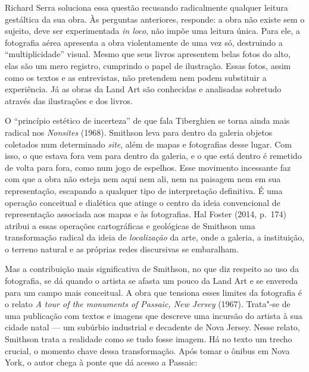 Richard Serra soluciona essa questão recusando radicalmente qualquer
leitura gestáltica da sua obra. Às perguntas anteriores, responde: a
obra não existe sem o sujeito, deve ser experimentada \emph{in loco},
não impõe uma leitura única. Para ele, a fotografia aérea apresenta a
obra violentamente de uma vez só, destruindo a ``multiplicidade''
visual. Mesmo que seus livros apresentem belas fotos do alto, elas são um mero registro, cumprindo o papel de
ilustração. Essas fotos, assim como os textos e as entrevistas, não
pretendem nem podem substituir a experiência. Já as obras da Land Art
são conhecidas e analisadas sobretudo através das ilustrações e dos
livros.

O ``princípio estético de incerteza'' de que fala Tiberghien se torna
ainda mais radical nos \emph{Nonsites} (1968). Smithson leva para dentro
da galeria objetos coletados num determinado \emph{site}, além de mapas
e fotografias desse lugar. Com isso, o que estava fora vem para dentro
da galeria, e o que está dentro é remetido de volta para fora, como num
jogo de espelhos. Esse movimento incessante faz com que a obra não
esteja nem aqui nem ali, nem na paisagem nem em sua representação,
escapando a qualquer tipo de interpretação definitiva. É uma operação
conceitual e dialética que atinge o centro da ideia convencional de
representação associada aos mapas e às fotografias. Hal Foster (2014, p.~174) atribui a essas operações cartográficas e geológicas de Smithson
uma transformação radical da ideia de \emph{localização} da arte, onde a
galeria, a instituição, o terreno natural e as próprias redes discursivas
se embaralham.

Mas a contribuição mais significativa de Smithson, no que diz respeito
ao uso da fotografia, se dá quando o artista se afasta um pouco da Land
Art e se envereda para um campo mais conceitual. A obra que
tensiona esses limites da fotografia é o relato \emph{A tour
of the monuments of Passaic, New Jersey} (1967). Trata"-se de uma
publicação com textos e imagens que descreve uma incursão do artista à
sua cidade natal --- um subúrbio industrial e decadente de Nova Jersey.
Nesse relato, Smithson trata a realidade como se tudo fosse imagem. Há
no texto um trecho crucial, o momento chave dessa transformação. Após
tomar o ônibus em Nova York, o autor chega à ponte que dá acesso a
Passaic:

